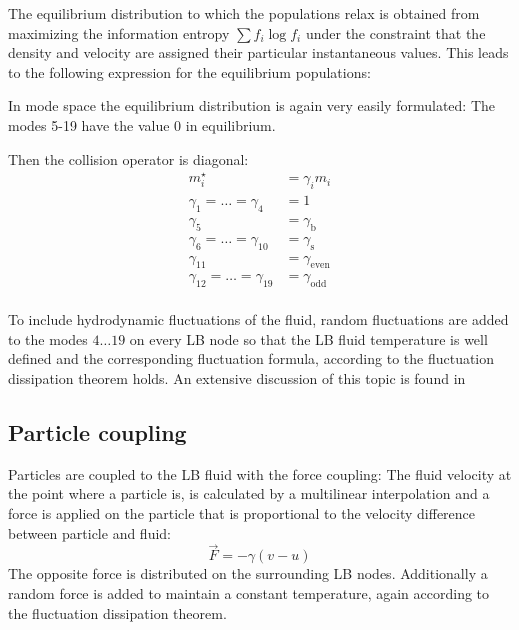 The equilibrium distribution to which the populations relax 
is obtained from maximizing the information entropy 
$\sum f_i \log f_i$ under the constraint that the density
and velocity are assigned their particular instantaneous 
values. This leads to the following expression for the
equilibrium populations:

In mode space the equilibrium distribution is again very 
easily formulated: The modes 5-19 have the value 0 in equilibrium.

Then the collision operator is diagonal:
\begin{align*}
  m^\star_i &= \gamma_i m_i  \\
  \gamma_1=\dots=\gamma_4&=1 \\
  \gamma_5&=\gamma_\text{b} \\
  \gamma_6=\dots=\gamma_{10}&=\gamma_\text{s} \\
  \gamma_{11}&=\gamma_\text{even} \\
  \gamma_{12}=\dots = \gamma_{19}&=\gamma_\text{odd} \\
\end{align*}

To include hydrodynamic fluctuations of the fluid, 
random fluctuations are added to the modes $4\dots 19$ on every LB node so that
the LB fluid temperature is well defined and the corresponding
fluctuation formula, according to the fluctuation dissipation theorem holds.
An extensive discussion of this topic is found in \cite{schiller08a}

\subsection*{Particle coupling}

Particles are coupled to the LB fluid with the force coupling:
The fluid velocity at the point where a particle is, is calculated 
by a multilinear interpolation and a force is applied on the particle
that is proportional to the velocity difference between particle 
and fluid:
\begin{equation}
  \vec{F} = - \gamma \left(v-u\right) 
\end{equation}
The opposite force is distributed on the surrounding LB nodes. Additionally
a random force is added to maintain a constant temperature, again according
to the fluctuation dissipation theorem.



